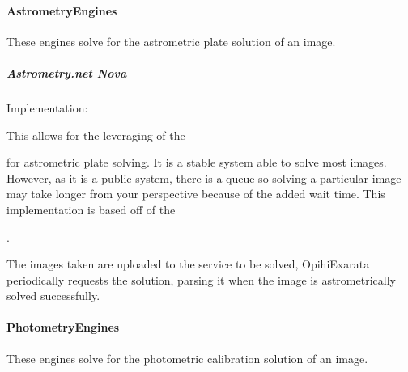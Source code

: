 \documentclass[letterpaper,11pt,english]{sphinxmanual}
\begin{document}
\paragraph{AstrometryEngines}
\label{\detokenize{technical/architecture/services_engines:astrometryengines}}\label{\detokenize{technical/architecture/services_engines:technical-architecture-services-engines-astrometryengines}}
\sphinxAtStartPar
These engines solve for the astrometric plate solution of an image.


\subparagraph{Astrometry.net Nova}
\label{\detokenize{technical/architecture/services_engines:astrometry-net-nova}}
\sphinxAtStartPar
Implementation: {\hyperref[\detokenize{code/opihiexarata.astrometry.webclient:opihiexarata.astrometry.webclient.AstrometryNetWebAPIEngine}]{}}

\sphinxAtStartPar
This allows for the leveraging of the
%
\begin{footnote}[42]\sphinxAtStartFootnote
{}
%
\end{footnote} for
astrometric plate solving. It is a stable system able to solve most images.
However, as it is a public system, there is a queue so solving a particular
image may take longer from your perspective because of the added wait time.
This implementation is based off of the
%
\begin{footnote}[43]\sphinxAtStartFootnote
{}
%
\end{footnote}.

\sphinxAtStartPar
The images taken are uploaded to the service to be solved, OpihiExarata
periodically requests the solution, parsing it when the image is astrometrically
solved successfully.


\paragraph{PhotometryEngines}
\label{\detokenize{technical/architecture/services_engines:photometryengines}}\label{\detokenize{technical/architecture/services_engines:technical-architecture-services-engines-photometryengines}}
\sphinxAtStartPar
These engines solve for the photometric calibration solution of an image.
\end{document}
